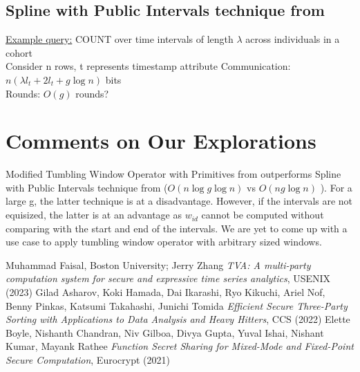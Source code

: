 \documentclass{article}
\begin{document}
\subsection{Spline with Public Intervals technique from \cite{Eu21}}
\underline{Example query:} COUNT over time intervals of length $\lambda$ across individuals in a cohort \\
Consider n rows, t represents timestamp attribute 
Communication: $n(\lambda l_t + 2l_t + g \log n)$ bits \\
Rounds: $O(g)$ rounds?

\section{Comments on Our Explorations}
Modified Tumbling Window Operator with Primitives from \cite{Ha22} outperforms Spline with Public Intervals technique from \cite{Eu21} ($O(n\log g\log n)$ vs $O(ng\log n)$ ). For a large g, the latter technique is at a disadvantage. However, if the intervals are not equisized, the latter is at an advantage as $w_{id}$ cannot be computed without comparing with the start and end of the intervals. We are yet to come up with a use case to apply tumbling window operator with arbitrary sized windows.

\begin{thebibliography}{99}

 Muhammad Faisal, Boston University; Jerry Zhang \emph{TVA: A multi-party computation system for secure and expressive time series analytics}, {USENIX} (2023)
 Gilad Asharov, Koki Hamada, Dai Ikarashi, Ryo Kikuchi, Ariel Nof, Benny Pinkas, Katsumi Takahashi, Junichi Tomida \emph{Efficient Secure Three-Party Sorting with Applications to Data Analysis and Heavy Hitters}, {CCS} (2022)
 Elette Boyle, Nishanth Chandran, Niv Gilboa, Divya Gupta, Yuval Ishai, Nishant Kumar, Mayank Rathee \emph{Function Secret Sharing for Mixed-Mode and Fixed-Point Secure Computation}, {Eurocrypt} (2021)

\end{thebibliography}
\end{document}
